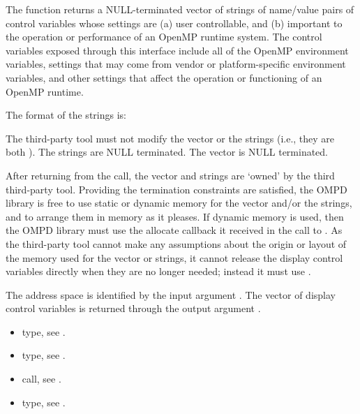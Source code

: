 \begin{itemize}
\descr
The function  returns a
NULL-terminated vector of strings of name/value pairs of control
variables whose settings are (a) user controllable,
and (b) important to the operation or performance of an OpenMP
runtime system.
The control variables exposed through this interface include all
of the OpenMP environment variables, settings that may come from
vendor or platform-specific environment variables, and other
settings that affect the operation or functioning of an OpenMP
runtime.

The format of the strings is:
\begin{center}
\end{center}

The third-party tool must not modify the vector or the strings
(i.e., they are both ).
The strings are NULL terminated.
The vector is NULL terminated.

After returning from the call, the vector and strings are `owned'
by the third third-party tool.
Providing the termination constraints are satisfied, the OMPD library
is free to use static or dynamic memory for the
vector and/or the strings, and to arrange them in memory
as it pleases.
If dynamic memory is used, then the OMPD library must use
the allocate callback it received in the call to .
As the third-party tool cannot make any assumptions about the origin or
layout of the memory used for the vector or strings, it cannot release
the display control variables directly when they are no longer
needed; instead it must use .

\argdesc
The address space is identified by the input argument .
The vector of display control variables is returned through
the output argument .

\crossreferences
\begin{itemize}
	\item {} type, see 
	.
	\item {} type, see .
	\item {} call, see .
	\item {} type, see 
	.
\end{itemize}



\end{itemize}
